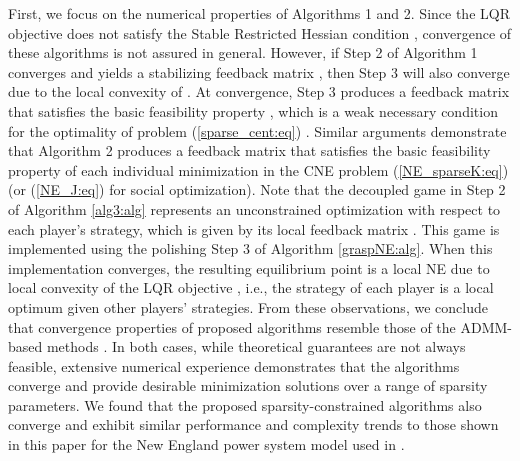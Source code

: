 \documentclass[12pt, draftclsnofoot,onecolumn]{IEEEtran}
\begin{document}
First, we focus on the numerical properties of Algorithms 1 and 2. Since the LQR objective does not satisfy the Stable Restricted Hessian condition \cite{bahmani2013greedy}, convergence of these algorithms is not assured in general. However, if Step 2 of Algorithm 1 converges and yields a stabilizing feedback matrix , then Step 3 will also converge due to the local convexity of . At convergence, Step 3 produces a feedback matrix  that satisfies the basic feasibility property , which is a weak necessary condition for the optimality of problem (\ref{sparse_cent:eq}) \cite{beck2013sparsity}. Similar arguments demonstrate that Algorithm 2 produces a feedback matrix that satisfies the basic feasibility property of each individual minimization in the CNE problem (\ref{NE_sparseK:eq}) (or (\ref{NE_J:eq}) for social optimization). Note that the decoupled game in Step 2 of Algorithm {\ref{alg3:alg}} represents an unconstrained optimization with respect to each player's strategy, which is given by its local feedback matrix \cite{lianensuring}. This game is implemented using the polishing Step 3 of Algorithm {\ref{graspNE:alg}}. When this implementation converges, the resulting equilibrium point is a local NE \cite{ratliff2013characterization} due to local convexity of the LQR objective \cite{rautert1997computational}, i.e., the strategy of each player is a local optimum given other players' strategies. From these observations, we conclude that convergence properties of proposed algorithms resemble those of the ADMM-based methods \cite{dorjovchebulTPS14}. In both cases, while theoretical guarantees are not always feasible, extensive numerical experience demonstrates that the algorithms converge and provide desirable minimization solutions over a range of sparsity parameters. We found that the proposed sparsity-constrained algorithms also converge and exhibit similar performance and complexity trends to those shown in this paper for the New England power system model used in \cite{dorjovchebulTPS14}.
\end{document}
